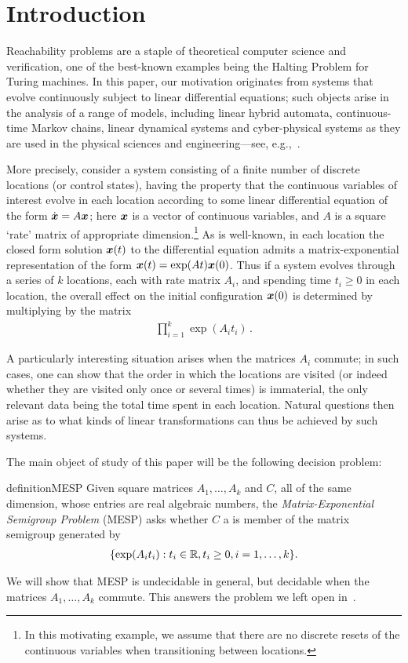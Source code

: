 \section{Introduction}

Reachability problems are a staple of theoretical computer
science and verification, one of the best-known examples being the
Halting Problem for Turing machines. In this paper, our motivation
originates from systems that evolve continuously subject to linear
differential equations; such objects arise in the analysis of a range
of models, including linear hybrid automata, continuous-time Markov
chains, linear dynamical systems and cyber-physical systems as they
are used in the physical sciences and engineering---see,
e.g.,~\cite{Alu15}.

More precisely, consider a system consisting of a finite number of
discrete locations (or control states), having the property that the
continuous variables of interest evolve in each location according to
some linear differential equation of the form $\dot{\boldsymbol{x}} = A
\boldsymbol{x}$; here $\boldsymbol{x}$ is a vector of continuous
variables, and $A$ is a square `rate' matrix of appropriate
dimension.\footnote{In
  this motivating example, we assume that there are no discrete
  resets of the continuous variables when transitioning between
  locations.}
As is well-known, in each location the closed form solution
$\boldsymbol{x}(t)$ to the differential equation admits a
matrix-exponential representation of the form $\boldsymbol{x}(t) =
\exp(At)\boldsymbol{x}(0)$. Thus if a system evolves through a series
of $k$ locations, each with rate matrix $A_i$, and spending time $t_i
\geq 0$ in each location, the overall effect on the initial
configuration $\boldsymbol{x}(0)$ is determined by multiplying by the matrix
\begin{align*}
\prod \limits_{i=1}^{k} \exp(A_{i} t_{i}) \, .
\end{align*}

A particularly interesting situation arises when the matrices $A_i$
commute; in such cases, one can show that the order in which the
locations are visited (or indeed whether they are visited only once or
several times) is immaterial, the only relevant data being the total
time spent in each location. Natural questions then arise as to what
kinds of linear transformations can thus be achieved by such systems.

The main object of study of this paper will be the following decision problem:
\begin{restatable}{definition}{MESP}
\label{def:MESP}
Given square matrices $A_{1}, \ldots, A_{k}$ and $C$, all of the same
dimension, whose entries are real algebraic numbers, the
\emph{Matrix-Exponential Semigroup Problem} (MESP) asks
whether $C$ a is member of the matrix semigroup generated by
\begin{align*}
    \lbrace \exp(A_{i} t_{i}) : t_{i} \in \mathbb{R}, t_{i} \geq 0, i=1,\ldots,k \rbrace.
\end{align*}
\end{restatable}
We will show that MESP is undecidable in general, but decidable when the matrices $A_{1}, \ldots, A_{k}$ commute.
This answers the problem we left open in~\cite{LICS16}.

